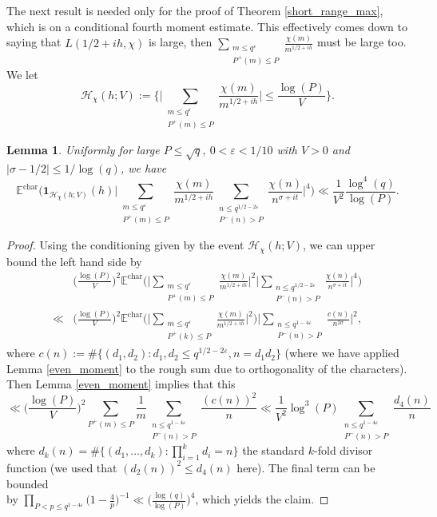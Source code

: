 \documentclass[reqno]{amsart}
\newtheorem{lemma}{Lemma}
\theoremstyle{definition}
\theoremstyle{remark}
\numberwithin{equation}{section}
\theoremstyle{remark}
\begin{document}
The next result is needed only for the proof of Theorem \ref{short_range_max}, which is on a conditional fourth moment estimate. This effectively comes down to saying that $L(1/2+ih,\chi)$ is large, then $\sum_{\substack{m \leq q^\varepsilon \\ P^+(m) \leq P}}\frac{\chi(m)}{m^{1/2+ih}}$ must be large too. We let
$$\mathcal{H}_\chi(h;V) := \big\{\big|\sum_{\substack{m \leq q^\varepsilon \\ P^+(m) \leq P}}\frac{\chi(m)}{m^{1/2+ih}}\big| \leq \frac{\log(P)}{V}\big\}.$$
\begin{lemma}
    Uniformly for large $ P \leq \sqrt{q}, \ 0 <\varepsilon < 1/10$ with $V>0$ and $|\sigma-1/2| \leq 1/\log(q)$, we have
    $$\mathbb{E}^{\text{char}}\big(\mathbf{1}_{\mathcal{H}_\chi(h;V)}(h)\big|\sum_{\substack{m \leq q^\varepsilon \\ P^+(m) \leq P}}\frac{\chi(m)}{m^{1/2+ih}}\sum_{\substack{n \leq q^{1/2-2\varepsilon} \\ P^{-}(n) > P}}\frac{\chi(n)}{n^{\sigma+it}}\big|^4\big) \ll \frac{1}{V^2}\frac{\log^4(q)}{\log(P)}.$$ \label{conditional_fourth}
\end{lemma}
\begin{proof}
    Using the conditioning given by the event $\mathcal{H}_\chi(h;V)$, we can upper bound the left hand side by
    \begin{align*}
        &\big(\frac{\log(P)}{V}\big)^2\mathbb{E}^{\text{char}}\big(\big|\sum_{\substack{m \leq q^\varepsilon \\ P^+(m) \leq P}}\frac{\chi(m)}{m^{1/2+ih}}\big|^2\big|\sum_{\substack{n \leq q^{1/2-2\varepsilon} \\ P^{-}(n) > P}}\frac{\chi(n)}{n^{\sigma+it}}\big|^4\big) \\
        \ll& \big(\frac{\log(P)}{V}\big)^2\mathbb{E}^{\text{char}}\big(\big|\sum_{\substack{m \leq q^\varepsilon \\ P^+(k) \leq P}}\frac{\chi(m)}{m^{1/2+ih}}\big|^2\big)\big|\sum_{\substack{n \leq q^{1-4\varepsilon} \\ P^{-}(n) > P}}\frac{c(n)}{n^{2\sigma}}\big|^2,
    \end{align*}
    where $c(n) := \#\{(d_1,d_2): d_1,d_2 \leq q^{1/2-2\varepsilon},  n=d_1d_2\}$ (where we have applied Lemma \ref{even_moment} to the rough sum due to orthogonality of the characters). Then Lemma \ref{even_moment} implies that this
    $$\ll \big(\frac{\log(P)}{V}\big)^2\sum_{P^+(m) \leq P}\frac{1}{m}\sum_{\substack{n \leq q^{1-4\varepsilon} \\ P^-(n) > P}}\frac{(c(n))^2}{n} \ll \frac{1}{V^2}\log^3(P)\sum_{\substack{n \leq q^{1-4\varepsilon} \\ P^-(n) > P}}\frac{d_4(n)}{n}$$
    where $d_k(n) = \#\{(d_1,...,d_k):\prod_{i=1}^kd_i=n\}$ the standard $k$-fold divisor function (we used that $(d_2(n))^2 \leq d_4(n)$ here). The final term can be bounded \\ by $\prod_{P < p \leq q^{1-4\varepsilon}}\big(1-\frac{4}{p}\big)^{-1} \ll \big(\frac{\log(q)}{\log(P)}\big)^4$, which yields the claim.  
\end{proof}
\end{document}
